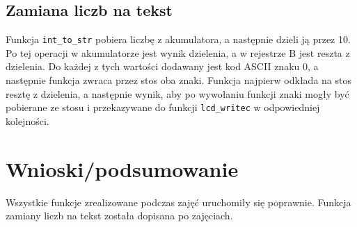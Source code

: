 \documentclass[12pt,a4paper]{article}
\begin{document}
		\subsection{Zamiana liczb na tekst}
			\begin{minipage}{.5\textwidth}
				
			\end{minipage}%
			\begin{minipage}{.5\textwidth}
				Funkcja \texttt{int\_to\_str} pobiera liczbę z akumulatora, a następnie dzieli ją przez 10.
				Po tej operacji w akumulatorze jest wynik dzielenia, a w rejestrze B jest reszta z dzielenia.
				Do każdej z tych wartości dodawany jest kod ASCII znaku 0, a następnie funkcja zwraca przez stos oba znaki.
				Funkcja najpierw odkłada na stos resztę z dzielenia, a następnie wynik, aby po wywołaniu funkcji znaki mogły być pobierane ze stosu i przekazywane do funkcji \texttt{lcd\_writec} w odpowiedniej kolejności.
			\end{minipage}

	\section{Wnioski/podsumowanie}
		Wszystkie funkcje zrealizowane podczas zajęć uruchomiły się poprawnie.
		Funkcja zamiany liczb na tekst została dopisana po zajęciach.
	
\end{document}
